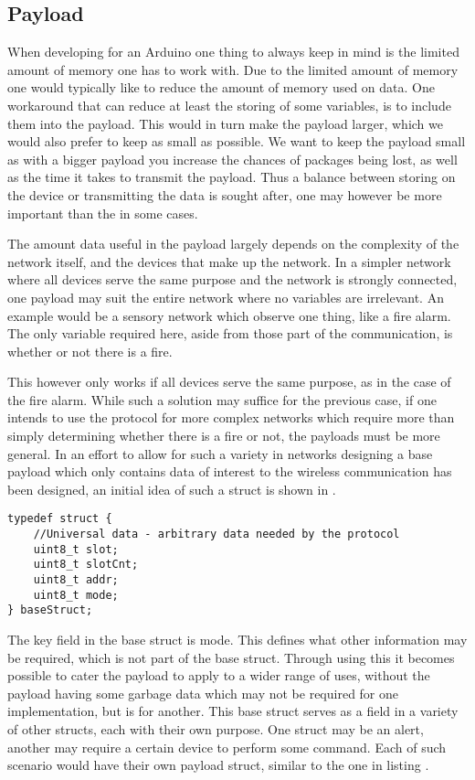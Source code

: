 \subsection{Payload}
When developing for an Arduino one thing to always keep in mind is the limited amount of memory one has to work with.
Due to the limited amount of memory one would typically like to reduce the amount of memory used on data.
One workaround that can reduce at least the storing of some variables, is to include them into the payload.
This would in turn make the payload larger, which we would also prefer to keep as small as possible.
We want to keep the payload small as with a bigger payload you increase the chances of packages being lost, as well as the time it takes to transmit the payload.
Thus a balance between storing on the device or transmitting the data is sought after, one may however be more important than the in some cases.

\bigskip \noindent
The amount data useful in the payload largely depends on the complexity of the network itself, and the devices that make up the network.
In a simpler network where all devices serve the same purpose and the network is strongly connected, one payload may suit the entire network where no variables are irrelevant.
An example would be a sensory network which observe one thing, like a fire alarm.
The only variable required here, aside from those part of the communication, is whether or not there is a fire.

This however only works if all devices serve the same purpose, as in the case of the fire alarm.
While such a solution may suffice for the previous case, if one intends to use the protocol for more complex networks which require more than simply determining whether there is a fire or not, the payloads must be more general.
In an effort to allow for such a variety in networks designing a base payload which only contains data of interest to the wireless communication has been designed, an initial idea of such a struct is shown in .

\bigskip \noindent
\lstset{style=customc}
\begin{lstlisting}[style=customc,caption={Possible way the baseStruct could look for the payload},label={baseStruct}]
typedef struct {
    //Universal data - arbitrary data needed by the protocol
    uint8_t slot;
    uint8_t slotCnt;
    uint8_t addr;
    uint8_t mode;
} baseStruct;
\end{lstlisting}
\bigskip \noindent
{}
The key field in the base struct is mode.
This defines what other information may be required, which is not part of the base struct.
Through using this it becomes possible to cater the payload to apply to a wider range of uses, without the payload having some garbage data which may not be required for one implementation, but is for another.
This base struct serves as a field in a variety of other structs, each with their own purpose.
One struct may be an alert, another may require a certain device to perform some command.
Each of such scenario would have their own payload struct, similar to the one in listing .

